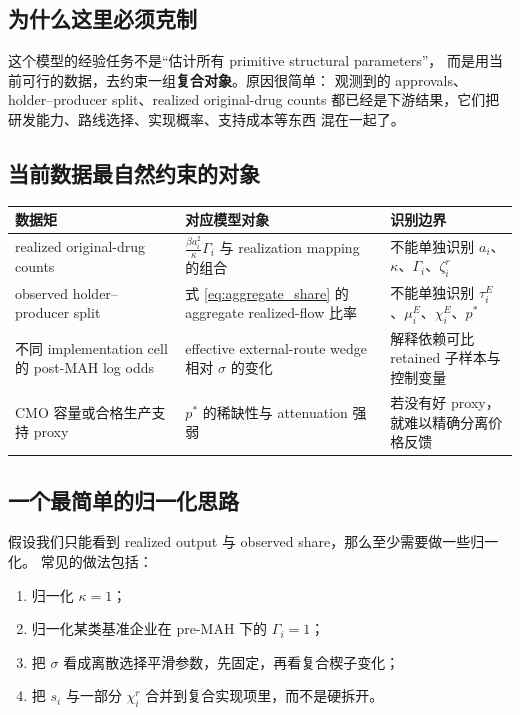 \documentclass[12pt,UTF8]{ctexart}
\theoremstyle{plain}
\theoremstyle{remark}
\begin{document}
\subsection{为什么这里必须克制}

这个模型的经验任务不是“估计所有 primitive structural parameters”，
而是用当前可行的数据，去约束一组\textbf{复合对象}。原因很简单：
观测到的 approvals、holder--producer split、realized original-drug counts
都已经是下游结果，它们把研发能力、路线选择、实现概率、支持成本等东西
混在一起了。

\subsection{当前数据最自然约束的对象}

\begin{center}
\small
\begin{tabularx}{\textwidth}{>{\raggedright\arraybackslash}p{} >{\raggedright\arraybackslash}p{} X}
\toprule
数据矩 & 对应模型对象 & 识别边界 \\
\midrule
realized original-drug counts &
$\frac{\beta a_i^2}{\kappa}\Gamma_i$ 与 realization mapping 的组合 &
不能单独识别 $a_i$、$\kappa$、$\Gamma_i$、$\zeta_i^r$ \\
observed holder--producer split &
式 \eqref{eq:aggregate_share} 的 aggregate realized-flow 比率 &
不能单独识别 $\tau_i^E$、$\mu_i^E$、$\chi_i^E$、$p^*$ \\
不同 implementation cell 的 post-MAH log odds &
effective external-route wedge 相对 $\sigma$ 的变化 &
解释依赖可比 retained 子样本与控制变量 \\
CMO 容量或合格生产支持 proxy &
$p^*$ 的稀缺性与 attenuation 强弱 &
若没有好 proxy，就难以精确分离价格反馈 \\
\bottomrule
\end{tabularx}
\end{center}

\subsection{一个最简单的归一化思路}

假设我们只能看到 realized output 与 observed share，那么至少需要做一些归一化。
常见的做法包括：

\begin{enumerate}[leftmargin=2em]
    \item 归一化 $\kappa=1$；
    \item 归一化某类基准企业在 pre-MAH 下的 $\Gamma_i=1$；
    \item 把 $\sigma$ 看成离散选择平滑参数，先固定，再看复合楔子变化；
    \item 把 $s_i$ 与一部分 $\chi_i^r$ 合并到复合实现项里，而不是硬拆开。
\end{enumerate}
\end{document}
